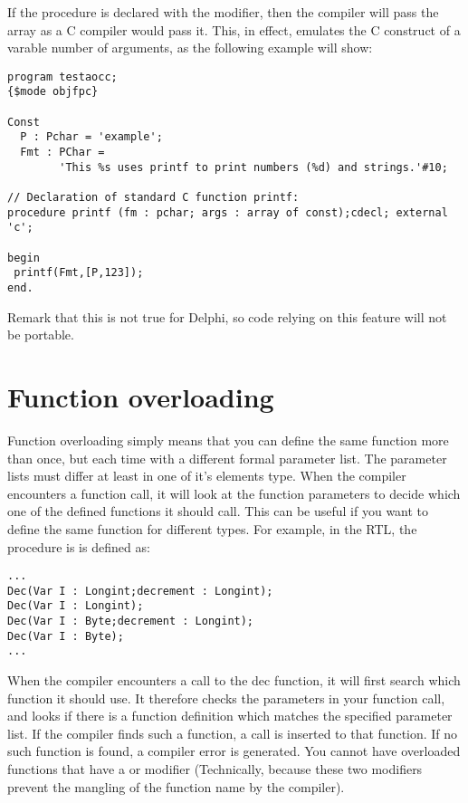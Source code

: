\documentclass{report}
\begin{document}
If the procedure is declared with the  modifier, then the 
compiler will pass the array as a C compiler would pass it. This, in effect,
emulates the C construct of a varable number of arguments, as the following
example will show:
\begin{verbatim}
program testaocc;
{$mode objfpc}

Const 
  P : Pchar = 'example';
  Fmt : PChar =
        'This %s uses printf to print numbers (%d) and strings.'#10;

// Declaration of standard C function printf: 
procedure printf (fm : pchar; args : array of const);cdecl; external 'c';

begin
 printf(Fmt,[P,123]);
end.
\end{verbatim}
Remark that this is not true for Delphi, so code relying on this feature 
will not be portable.

\section{Function overloading}
Function overloading simply means that you can define the same function more
than once, but each time with a different formal parameter list.
The parameter lists must differ at least in one of it's elements type.
When the compiler encounters a function call, it will look at the function
parameters to decide which one of the defined functions it should call.
This can be useful if you want to define the same function for different
types. For example, in the RTL, the   procedure is
is defined as:
\begin{verbatim}
...
Dec(Var I : Longint;decrement : Longint);
Dec(Var I : Longint);
Dec(Var I : Byte;decrement : Longint);
Dec(Var I : Byte);
...
\end{verbatim}
When the compiler encounters a call to the dec function, it will first search
which function it should use. It therefore checks the parameters in your
function call, and looks if there is a function definition which matches the
specified parameter list. If the compiler finds such a function, a call is
inserted to that function. If no such function is found, a compiler error is
generated.
You cannot have overloaded functions that have a  or 
modifier (Technically, because these two modifiers prevent the mangling of
the function name by the compiler).

\end{document}
